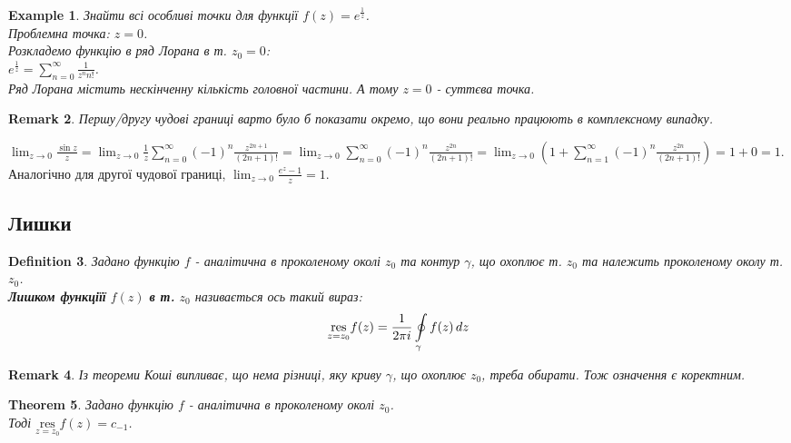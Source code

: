 \documentclass[a4paper, 10pt]{article}
\def\residue#1#2{\underset{z = {#1}}{\textrm{res}} {#2}}
\theoremstyle{theoremdd}
\newtheorem{theorem}{Theorem}[subsection]
\theoremstyle{theoremdd}
\newtheorem{definition}[theorem]{Definition}
\theoremstyle{theoremdd}
\theoremstyle{theoremdd}
\newtheorem{example}[theorem]{Example}
\theoremstyle{theoremdd}
\theoremstyle{theoremdd}
\newtheorem{remark}[theorem]{Remark}
\theoremstyle{theoremdd}
\theoremstyle{theoremdd}
\begin{document}
\begin{example}
Знайти всі особливі точки для функції $\displaystyle f(z) = e^{\textstyle \frac{1}{z}}$.\\
Проблемна точка: $z = 0$.\\
Розкладемо функцію в ряд Лорана в т. $z_0 = 0$:\\
$\displaystyle e^{\textstyle \frac{1}{z}} = \sum_{n=0}^{\infty} \frac{1}{z^n n!}$.\\
Ряд Лорана містить нескінченну кількість головної частини. А тому $z = 0$ - суттєва точка.
\end{example}

\begin{remark}
Першу/другу чудові границі варто було б показати окремо, що вони реально працюють в комплексному випадку.
\end{remark}

$\displaystyle \lim_{z \to 0} \frac{\sin z}{z} = \lim_{z \to 0} \frac{1}{z} \sum_{n=0}^{\infty} (-1)^n \frac{z^{2n+1}}{(2n+1)!} = \lim_{z \to 0} \sum_{n=0}^{\infty} (-1)^n \frac{z^{2n}}{(2n+1)!} = \lim_{z \to 0} \left(1 + \sum_{n=1}^{\infty} (-1)^n \frac{z^{2n}}{(2n+1)!}\right) = 1 + 0 = 1$.\\
Аналогічно для другої чудової границі, $\displaystyle \lim_{z \to 0} \frac{e^z - 1}{z} = 1$.

\subsection{Лишки}
\begin{definition}
Задано функцію $f$ - аналітична в проколеному околі $z_0$ та контур $\gamma$, що охоплює т. $z_0$ та належить проколеному околу т. $z_0$.\\
\textbf{Лишком функціїї} $f(z)$ \textbf{в т.} $z_0$ називається ось такий вираз:
\begin{align*}
 \underset{z = z_0}{\textrm{res}} f(z) = \frac{1}{2 \pi i} \oint\displaylimits_{\gamma} f(z) \,dz
\end{align*}
\end{definition}

\begin{remark}
Із теореми Коші випливає, що нема різниці, яку криву $\gamma$, що охоплює $z_0$, треба обирати. Тож означення є коректним.
\end{remark}

\begin{theorem}
Задано функцію $f$ - аналітична в проколеному околі $z_0$. \\
Тоді $\displaystyle \residue{z_0}{f(z)} = c_{-1}$.
\end{theorem}
\end{document}
